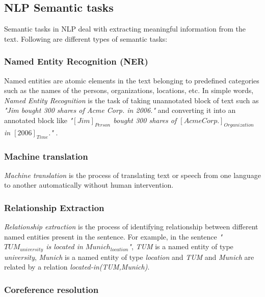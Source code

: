 \subsection{NLP Semantic tasks}

Semantic tasks in NLP deal with extracting meaningful information from the text. Following are different types of semantic tasks:

\subsubsection{Named Entity Recognition (NER)}

Named entities are atomic elements in the text belonging to predefined categories \cite{ner1} such as the names of the persons, organizations, locations, etc. In simple words, \textit{Named Entity Recognition} is the task of taking unannotated block of text such as \textit{"Jim bought 300 shares of Acme Corp. in 2006."} and converting it into an annotated block like \textit{"$[Jim]_{Person}$ bought 300 shares of $[Acme Corp.]_{Organization}$ in $[2006]_{Time}$."} \cite{wiki:ner}.

\subsubsection{Machine translation}

\textit{Machine translation} is the process of translating text or speech from one language to another automatically without human intervention.

\subsubsection{Relationship Extraction}\label{sec:RE}

\textit{Relationship extraction} is the process of identifying relationship between different named entities present in the sentence. For example, in the sentence \textit{"$TUM_{university}$ is located in $Munich_{location}$"}, \textit{TUM} is a named entity of type \textit{university}, \textit{Munich} is a named entity of type \textit{location} and \textit{TUM} and \textit{Munich} are related by a relation \textit{located-in(TUM,Munich)}.

\subsubsection{Coreference resolution}

